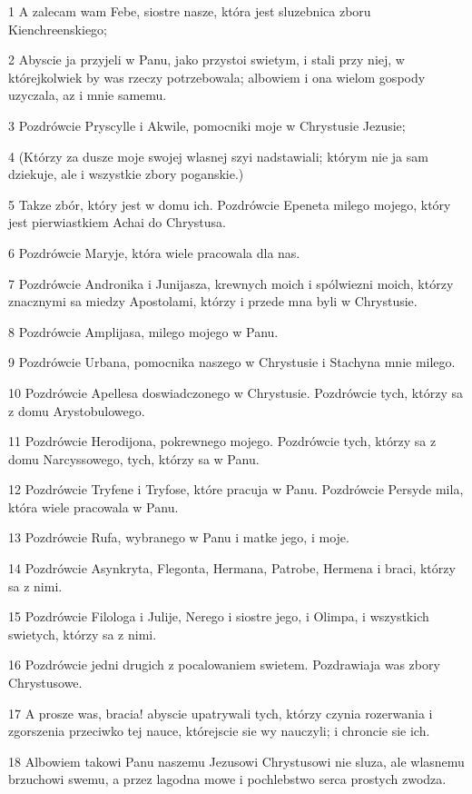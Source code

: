 \par 1 A zalecam wam Febe, siostre nasze, która jest sluzebnica zboru Kienchreenskiego;
\par 2 Abyscie ja przyjeli w Panu, jako przystoi swietym, i stali przy niej, w którejkolwiek by was rzeczy potrzebowala; albowiem i ona wielom gospody uzyczala, az i mnie samemu.
\par 3 Pozdrówcie Pryscylle i Akwile, pomocniki moje w Chrystusie Jezusie;
\par 4 (Którzy za dusze moje swojej wlasnej szyi nadstawiali; którym nie ja sam dziekuje, ale i wszystkie zbory poganskie.)
\par 5 Takze zbór, który jest w domu ich. Pozdrówcie Epeneta milego mojego, który jest pierwiastkiem Achai do Chrystusa.
\par 6 Pozdrówcie Maryje, która wiele pracowala dla nas.
\par 7 Pozdrówcie Andronika i Junijasza, krewnych moich i spólwiezni moich, którzy znacznymi sa miedzy Apostolami, którzy i przede mna byli w Chrystusie.
\par 8 Pozdrówcie Amplijasa, milego mojego w Panu.
\par 9 Pozdrówcie Urbana, pomocnika naszego w Chrystusie i Stachyna mnie milego.
\par 10 Pozdrówcie Apellesa doswiadczonego w Chrystusie. Pozdrówcie tych, którzy sa z domu Arystobulowego.
\par 11 Pozdrówcie Herodijona, pokrewnego mojego. Pozdrówcie tych, którzy sa z domu Narcyssowego, tych, którzy sa w Panu.
\par 12 Pozdrówcie Tryfene i Tryfose, które pracuja w Panu. Pozdrówcie Persyde mila, która wiele pracowala w Panu.
\par 13 Pozdrówcie Rufa, wybranego w Panu i matke jego, i moje.
\par 14 Pozdrówcie Asynkryta, Flegonta, Hermana, Patrobe, Hermena i braci, którzy sa z nimi.
\par 15 Pozdrówcie Filologa i Julije, Nerego i siostre jego, i Olimpa, i wszystkich swietych, którzy sa z nimi.
\par 16 Pozdrówcie jedni drugich z pocalowaniem swietem. Pozdrawiaja was zbory Chrystusowe.
\par 17 A prosze was, bracia! abyscie upatrywali tych, którzy czynia rozerwania i zgorszenia przeciwko tej nauce, którejscie sie wy nauczyli; i chroncie sie ich.
\par 18 Albowiem takowi Panu naszemu Jezusowi Chrystusowi nie sluza, ale wlasnemu brzuchowi swemu, a przez lagodna mowe i pochlebstwo serca prostych zwodza.
